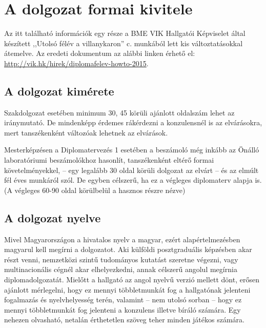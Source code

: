 \section{A dolgozat formai kivitele}
Az itt található információk egy része a BME VIK Hallgatói Képviselet által készített ,,Utolsó félév a villanykaron'' c. munkából lett kis változtatásokkal átemelve. Az eredeti dokumentum az alábbi linken érhető el: \url{http://vik.hk/hirek/diplomafelev-howto-2015}.

\subsection{A dolgozat kimérete}
Szakdolgozat esetében minimum 30, 45 körüli ajánlott oldalszám lehet az iránymutató. De mindenképp érdemes rákérdezni a konzulensnél is az elvárásokra, mert tanszékenként változóak lehetnek az elvárások.

Mesterképzésen a Diplomatervezés 1 esetében a beszámoló még inkább az Önálló laboratóriumi beszámolókhoz hasonlít, tanszékenként eltérő formai követelményekkel, -- egy legalább 30 oldal körüli dolgozat az elvárt -- és az elmúlt fél éves munkáról szól. De egyben célszerű, ha ez a végleges diplomaterv alapja is. (A végleges 60-90 oldal körülbelül a hasznos részre nézve)


\subsection{A dolgozat nyelve}
Mivel Magyarországon a hivatalos nyelv a magyar, ezért alapértelmezésben magyarul kell megírni a dolgozatot. Aki külföldi posztgraduális képzésben akar részt venni, nemzetközi szintű tudományos kutatást szeretne végezni, vagy multinacionális cégnél akar elhelyezkedni, annak célszerű angolul megírnia diplomadolgozatát. Mielőtt a hallgató az angol nyelvű verzió mellett dönt, erősen ajánlott mérlegelni, hogy ez mennyi többletmunkát fog a hallgatónak jelenteni fogalmazás és nyelvhelyesség terén, valamint -- nem utolsó sorban -- hogy ez mennyi többletmunkát fog jelenteni a konzulens illetve bíráló számára. Egy nehezen olvasható, netalán érthetetlen szöveg teher minden játékos számára.

